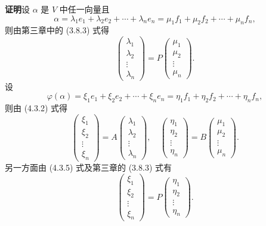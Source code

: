 \documentclass[UTF8,12pt,a4paper,fontset=fandol]{ctexart}
\begin{document}
\noindent\textbf{证明}\quad 设 $\alpha$ 是 $V$ 中任一向量且
\[
\alpha=\lambda_1e_1+\lambda_2e_2+\cdots+\lambda_ne_n=\mu_1f_1+\mu_2f_2+\cdots+\mu_nf_n,
\]
则由第三章中的 (3.8.3) 式得
\begin{equation}
\left(\begin{array}{c}
\lambda_1\\
\lambda_2\\
\vdots\\
\lambda_n
\end{array}\right)
=P
\left(\begin{array}{c}
\mu_1\\
\mu_2\\
\vdots\\
\mu_n
\end{array}\right).
\tag{4.3.4}
\end{equation}
设
\begin{equation}
\varphi(\alpha)=\xi_1e_1+\xi_2e_2+\cdots+\xi_ne_n=\eta_1f_1+\eta_2f_2+\cdots+\eta_nf_n,
\tag{4.3.5}
\end{equation}
则由 (4.3.2) 式得
\begin{equation}
\left(\begin{array}{c}
\xi_1\\
\xi_2\\
\vdots\\
\xi_n
\end{array}\right)
=A
\left(\begin{array}{c}
\lambda_1\\
\lambda_2\\
\vdots\\
\lambda_n
\end{array}\right),\quad
\left(\begin{array}{c}
\eta_1\\
\eta_2\\
\vdots\\
\eta_n
\end{array}\right)
=B
\left(\begin{array}{c}
\mu_1\\
\mu_2\\
\vdots\\
\mu_n
\end{array}\right).
\tag{4.3.6}
\end{equation}
另一方面由 (4.3.5) 式及第三章的 (3.8.3) 式有
\begin{equation}
\left(\begin{array}{c}
\xi_1\\
\xi_2\\
\vdots\\
\xi_n
\end{array}\right)
=P
\left(\begin{array}{c}
\eta_1\\
\eta_2\\
\vdots\\
\eta_n
\end{array}\right).
\tag{4.3.7}
\end{equation}
\end{document}

